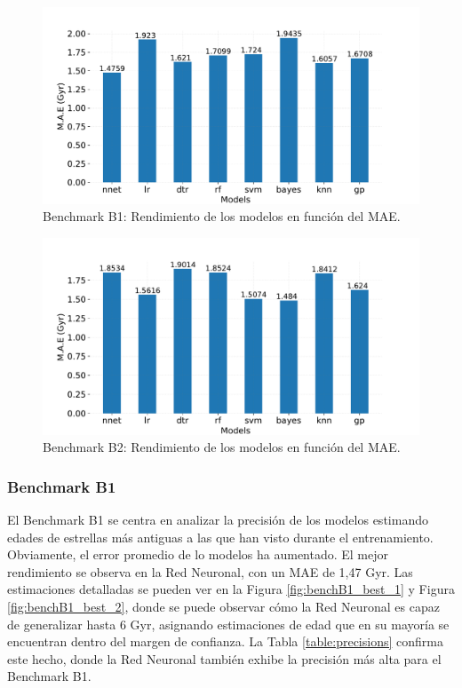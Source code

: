 \begin{figure}[H]
\begin{center}
 \includegraphics[width=0.8\linewidth]{Figuras/Experimentos/B_B1_models.pdf}
\end{center}
\caption{Benchmark B1: Rendimiento de los modelos en función del MAE.}
 \label{fig:benchB1}
\end{figure}

\begin{figure}[H]
\begin{center}
 \includegraphics[width=0.8\linewidth]{Figuras/Experimentos/B_B2_models.pdf}
\end{center}
\caption{Benchmark B2: Rendimiento de los modelos en función del MAE.}
 \label{fig:benchB2}
\end{figure}

\subsubsection{Benchmark B1} 

El Benchmark B1 se centra en analizar la precisión de los modelos estimando edades de estrellas más antiguas a las que han visto durante el entrenamiento. Obviamente, el error promedio de lo modelos ha aumentado. El mejor rendimiento se observa en la Red Neuronal, con un MAE de 1,47 Gyr. Las estimaciones detalladas se pueden ver en la Figura \ref{fig:benchB1_best_1} y Figura \ref{fig:benchB1_best_2}, donde se puede observar cómo la Red Neuronal es capaz de generalizar hasta 6 Gyr, asignando estimaciones de edad que en su mayoría se encuentran dentro del margen de confianza. La Tabla \ref{table:precisions} confirma este hecho, donde la Red Neuronal también exhibe la precisión más alta para el Benchmark B1.

